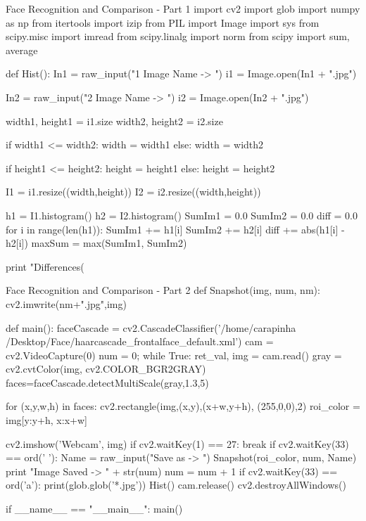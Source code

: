 \documentclass[12pt]{article}
\begin{document}
\begin{codelisting}{Face Recognition and Comparison - Part 1}
import cv2
import glob
import numpy as np
from itertools import izip
from PIL import Image
import sys
from scipy.misc import imread
from scipy.linalg import norm
from scipy import sum, average

def Hist():
	In1 = raw_input("1 Image Name -> ")
	i1 = Image.open(In1 + ".jpg")

	In2 = raw_input("2 Image Name -> ")
	i2 = Image.open(In2 + ".jpg")

	width1, height1 = i1.size
	width2, height2 = i2.size

	if width1 <= width2:
		width = width1
	else:
		width = width2

	if height1 <= height2:
		height = height1
	else:
		height = height2

	I1 = i1.resize((width,height))
	I2 = i2.resize((width,height))

        h1 = I1.histogram()
        h2 = I2.histogram()
        SumIm1 = 0.0
        SumIm2 = 0.0
	diff = 0.0
	for i in range(len(h1)):
        	SumIm1 += h1[i]
        	SumIm2 += h2[i]
	   	diff += abs(h1[i] - h2[i])
		maxSum = max(SumIm1, SumIm2)
	
        print "Differences(%
\end{codelisting}

\begin{codelisting}{Face Recognition and Comparison - Part 2}
def Snapshot(img, num, nm):
        cv2.imwrite(nm+".jpg",img)

def main():
	faceCascade = cv2.CascadeClassifier('/home/carapinha
/Desktop/Face/haarcascade_frontalface_default.xml')
	cam = cv2.VideoCapture(0)
	num = 0;
	while True:
		ret_val, img = cam.read()
		gray = cv2.cvtColor(img, cv2.COLOR_BGR2GRAY)
		faces=faceCascade.detectMultiScale(gray,1.3,5)

		for (x,y,w,h) in faces:
		         cv2.rectangle(img,(x,y),(x+w,y+h),
(255,0,0),2)
		         roi_color = img[y:y+h, x:x+w]

		cv2.imshow('Webcam', img)
		if cv2.waitKey(1) == 27: 
			break
		if cv2.waitKey(33) == ord(' '):
			Name = raw_input("Save as -> ")
			Snapshot(roi_color, num, Name)
			print "Image Saved -> " + str(num)
			num = num + 1
		if cv2.waitKey(33) == ord('a'):
			print(glob.glob('*.jpg'))
			Hist()
	cam.release()	
	cv2.destroyAllWindows()

if __name__ == "__main__":
	main()
\end{codelisting}
\end{document}
